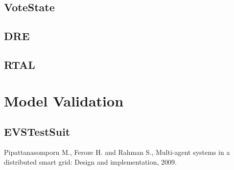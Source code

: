 \documentclass{article}
\begin{document}
\subsection{VoteState}

\subsection{DRE}

\subsection{RTAL}

\section{Model Validation}
\subsection{EVSTestSuit}

\renewcommand{\refname}{\section{Bibliography}} %
\begin{thebibliography}{99}
Pipattanasomporn M., Feroze H. and Rahman S., Multi-agent systems in a distributed smart grid: Design and implementation, 2009.
\end{thebibliography}
\end{document}
